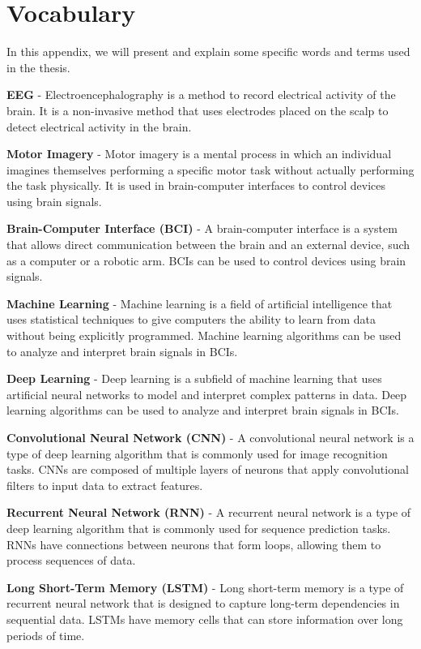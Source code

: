 \chapter{Vocabulary}\label{app:vocabulary}
In this appendix, we will present and explain some specific words and terms used in the thesis.

\textbf{EEG} - Electroencephalography is a method to record electrical activity of the brain. It is a non-invasive method that uses electrodes placed on the scalp to detect electrical activity in the brain.

\textbf{Motor Imagery} - Motor imagery is a mental process in which an individual imagines themselves performing a specific motor task without actually performing the task physically. It is used in brain-computer interfaces to control devices using brain signals.

\textbf{Brain-Computer Interface (BCI)} - A brain-computer interface is a system that allows direct communication between the brain and an external device, such as a computer or a robotic arm. BCIs can be used to control devices using brain signals.

\textbf{Machine Learning} - Machine learning is a field of artificial intelligence that uses statistical techniques to give computers the ability to learn from data without being explicitly programmed. Machine learning algorithms can be used to analyze and interpret brain signals in BCIs.

\textbf{Deep Learning} - Deep learning is a subfield of machine learning that uses artificial neural networks to model and interpret complex patterns in data. Deep learning algorithms can be used to analyze and interpret brain signals in BCIs.

\textbf{Convolutional Neural Network (CNN)} - A convolutional neural network is a type of deep learning algorithm that is commonly used for image recognition tasks. CNNs are composed of multiple layers of neurons that apply convolutional filters to input data to extract features.

\textbf{Recurrent Neural Network (RNN)} - A recurrent neural network is a type of deep learning algorithm that is commonly used for sequence prediction tasks. RNNs have connections between neurons that form loops, allowing them to process sequences of data.

\textbf{Long Short-Term Memory (LSTM)} - Long short-term memory is a type of recurrent neural network that is designed to capture long-term dependencies in sequential data. LSTMs have memory cells that can store information over long periods of time.

